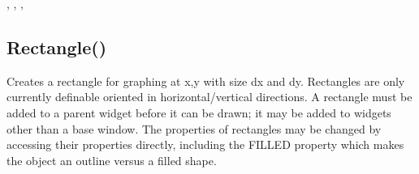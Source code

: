 \documentclass[letterpaper,10pt,english]{sphinxmanual}
\begin{document}
\sphinxAtStartPar
{}, ,  , 

\ignorespaces 

\subsection{Rectangle()}
\label{\detokenize{reference/peblobjects:rectangle}}\label{\detokenize{reference/peblobjects:index-38}}
\sphinxAtStartPar
{}

\sphinxAtStartPar
{}

\sphinxAtStartPar
Creates a rectangle for graphing at x,y with size   dx and dy. Rectangles are only currently definable oriented in   horizontal/vertical directions.  A rectangle  must be added   to a parent widget before it can be drawn; it may be added to   widgets other than a base window.  The properties of rectangles may be   changed by accessing their properties directly, including the FILLED   property which makes the object an outline versus a filled shape.

\sphinxAtStartPar
{}

\begin{sphinxVerbatim}[commandchars=\\\{\}]
\end{sphinxVerbatim}

\sphinxAtStartPar
{}

\begin{sphinxVerbatim}[commandchars=\\\{\}]
\end{sphinxVerbatim}
\end{document}
